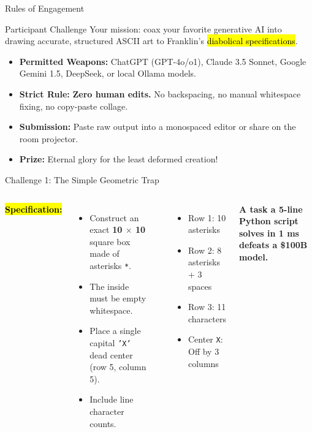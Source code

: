\documentclass[aspectratio=169,11pt,xcolor={table,dvipsnames}]{beamer}
\begin{document}
\begin{frame}{Rules of Engagement}
  \begin{block}{Participant Challenge}
    Your mission: coax your favorite generative AI into drawing accurate, structured ASCII art to Franklin's \hl{diabolical specifications}.
  \end{block}

  \vspace{0.3cm}
  \begin{itemize}
    \item \textbf{Permitted Weapons:} ChatGPT (GPT-4o/o1), Claude 3.5 Sonnet, Google Gemini 1.5, DeepSeek, or local Ollama models.
    \item \textbf{Strict Rule:} \textbf{Zero human edits.} No backspacing, no manual whitespace fixing, no copy-paste collage.
    \item \textbf{Submission:} Paste raw output into a monospaced editor or share on the room projector.
    \item \textbf{Prize:} Eternal glory for the least deformed creation!
  \end{itemize}
\end{frame}

\begin{frame}{Challenge 1: The Simple Geometric Trap}
  \begin{columns}[T]
      \textbf{\hl{Specification:}}
      \begin{itemize}
        \item Construct an exact \textbf{10 $\times$ 10} square box made of asterisks \texttt{*}.
        \item The inside must be empty whitespace.
        \item Place a single capital \texttt{'X'} dead center (row 5, column 5).
        \item Include line character counts.
      \end{itemize}

      \textbf{}
      \begin{itemize}
        \item Row 1: 10 asterisks
        \item Row 2: 8 asterisks + 3 spaces
        \item Row 3: 11 characters
        \item Center \texttt{X}: Off by 3 columns
      \end{itemize}
      \vspace{0.3cm}
      \centering
      \small\textcolor{accentcyan}{\textbf{A task a 5-line Python script solves in 1 ms defeats a \$100B model.}}
  \end{columns}
\end{frame}
\end{document}
